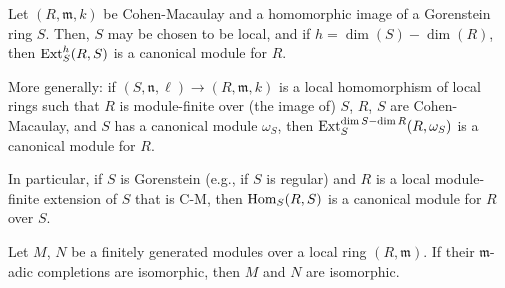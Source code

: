 \documentclass[12pt]{article}
\begin{document}
\begin{thm}
	Let $(R, \mathfrak{m}, k)$ be Cohen-Macaulay and a homomorphic image of a Gorenstein ring $S$. Then, $S$ may be chosen to be local, and if $h = \dim(S) - \dim(R)$, then $\operatorname{Ext}_{S}^{h}(R, S)$ is a canonical module for $R$.

	More generally: if $(S, \mathfrak{n}, \ell) \to (R, \mathfrak{m}, k)$ is a local homomorphism of local rings such that $R$ is module-finite over (the image of) $S$, $R$, $S$ are Cohen-Macaulay, and $S$ has a canonical module $\omega_{S}$, then $\operatorname{Ext}_{S}^{\dim S - \dim R}(R, \omega_{S})$ is a canonical module for $R$.
\end{thm}
In particular, if $S$ is Gorenstein (e.g., if $S$ is regular) and $R$ is a local module-finite extension of $S$ that is C-M, then $\operatorname{Hom}_{S}(R, S)$ is a canonical module for $R$ over $S$.

\begin{lem} 
	Let $M$, $N$ be a finitely generated modules over a local ring $(R, \mathfrak{m})$. If their $\mathfrak{m}$-adic completions are isomorphic, then $M$ and $N$ are isomorphic.
\end{lem}
\end{document}
